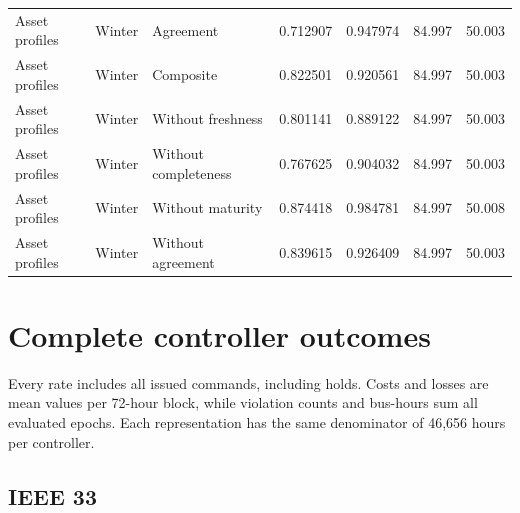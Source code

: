 \documentclass[11pt]{article}
\begin{document}
\begin{longtable}{lllrrrr}
Asset profiles & Winter & Agreement & 0.712907 & 0.947974 & 84.997 & 50.003\\
Asset profiles & Winter & Composite & 0.822501 & 0.920561 & 84.997 & 50.003\\
Asset profiles & Winter & Without freshness & 0.801141 & 0.889122 & 84.997 & 50.003\\
Asset profiles & Winter & Without completeness & 0.767625 & 0.904032 & 84.997 & 50.003\\
Asset profiles & Winter & Without maturity & 0.874418 & 0.984781 & 84.997 & 50.008\\
Asset profiles & Winter & Without agreement & 0.839615 & 0.926409 & 84.997 & 50.003\\
\end{longtable}\normalsize
\section{Complete controller outcomes}
Every rate includes all issued commands, including holds. Costs and losses are mean values per 72-hour block, while violation counts and bus-hours sum all evaluated epochs. Each representation has the same denominator of 46,656 hours per controller.
\subsection{IEEE 33}
\end{document}

